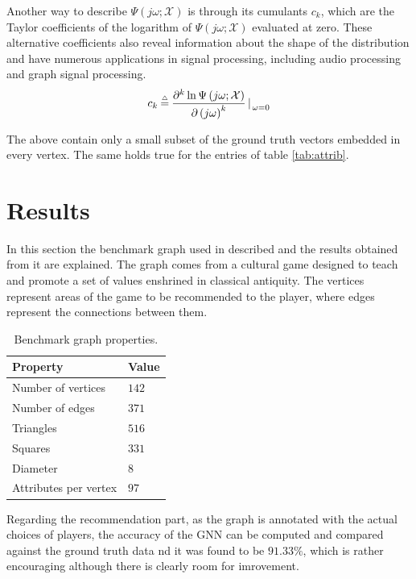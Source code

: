 \documentclass[conference, compsoc, final]{IEEEtran}
\newcommand{\bmdef}{{\buildrel{{\mathsmaller{\triangle}}}\over{=}}}
\newcommand{\bmparen}[1]{\left({#1}\right)}
\newcommand{\bmrv}[1]{\mathcal{#1}}
\begin{document}
Another way to describe $\Psi\bmparen{j\omega; \bmrv{X}}$ is through its cumulants $c_k$, which are the Taylor coefficients of the logarithm of $\Psi\bmparen{j\omega; \bmrv{X}}$ evaluated at zero. These alternative coefficients also reveal information about the shape of the distribution and have numerous applications in signal processing, including audio processing and graph signal processing.
\begin{equation}
c_k  \:\bmdef\:
    \dfrac{\partial^k \ln\Psi\bmparen{j\omega; \bmrv{X}}}{\partial \bmparen{j\omega}^k} \left\lvert\right._{\omega = 0}
\label{eq:cumulant}
\end{equation}

The above contain only a small subset of the ground truth vectors embedded in every vertex. The same holds true for the entries of table \ref{tab:attrib}.


\section{Results}\label{sec:results}


In this section the benchmark graph used in described and the results obtained from it are explained. The graph comes from a cultural game designed to teach and promote a set of values enshrined in classical antiquity. The vertices represent areas of the game to be recommended to the player, where edges represent the connections between them. 

\begin{table}[thbp]
\centering%
\caption{Benchmark graph properties.}
\label{tab:graphs}
    \begin{tabular}{ll}
    \hline
    \textbf{Property}  &  \textbf{Value}  \\
    \hline
    Number of vertices  &  $142$  \\
    Number of edges  &  $371$  \\
    Triangles  &  $516$  \\
    Squares  &  $331$  \\
    Diameter  &  $8$  \\
    Attributes per vertex  &  $97$  \\
    \hline
    \end{tabular}
\end{table}

Regarding the recommendation part, as the graph is annotated with the actual choices of players, the accuracy of the GNN can be computed and compared against the ground truth data nd it was found to be $91.33\%$, which is rather encouraging although there is clearly room for imrovement.
\end{document}
